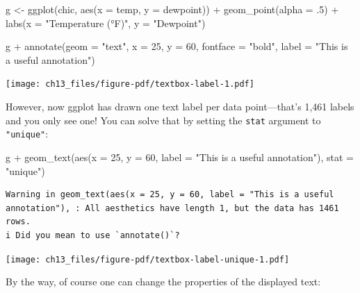 \documentclass[
  letterpaper,
  DIV=11,
  numbers=noendperiod]{scrreprt}
\newenvironment{Shaded}{\begin{snugshade}}{\end{snugshade}}
\newcommand{\AttributeTok}[1]{\textcolor[rgb]{0.40,0.45,0.13}{#1}}
\newcommand{\DecValTok}[1]{\textcolor[rgb]{0.68,0.00,0.00}{#1}}
\newcommand{\FunctionTok}[1]{\textcolor[rgb]{0.28,0.35,0.67}{#1}}
\newcommand{\NormalTok}[1]{\textcolor[rgb]{0.00,0.23,0.31}{#1}}
\newcommand{\OtherTok}[1]{\textcolor[rgb]{0.00,0.23,0.31}{#1}}
\newcommand{\SpecialCharTok}[1]{\textcolor[rgb]{0.37,0.37,0.37}{#1}}
\newcommand{\StringTok}[1]{\textcolor[rgb]{0.13,0.47,0.30}{#1}}
\begin{document}
\begin{Shaded}
\begin{Highlighting}[]
\NormalTok{g }\OtherTok{\textless{}{-}}
  \FunctionTok{ggplot}\NormalTok{(chic, }\FunctionTok{aes}\NormalTok{(}\AttributeTok{x =}\NormalTok{ temp, }\AttributeTok{y =}\NormalTok{ dewpoint)) }\SpecialCharTok{+}
  \FunctionTok{geom\_point}\NormalTok{(}\AttributeTok{alpha =}\NormalTok{ .}\DecValTok{5}\NormalTok{) }\SpecialCharTok{+}
  \FunctionTok{labs}\NormalTok{(}\AttributeTok{x =} \StringTok{"Temperature (°F)"}\NormalTok{, }\AttributeTok{y =} \StringTok{"Dewpoint"}\NormalTok{)}

\NormalTok{g }\SpecialCharTok{+} 
  \FunctionTok{annotate}\NormalTok{(}\AttributeTok{geom =} \StringTok{"text"}\NormalTok{, }\AttributeTok{x =} \DecValTok{25}\NormalTok{, }\AttributeTok{y =} \DecValTok{60}\NormalTok{, }\AttributeTok{fontface =} \StringTok{"bold"}\NormalTok{, }
                \AttributeTok{label =} \StringTok{"This is a useful annotation"}\NormalTok{)}
\end{Highlighting}
\end{Shaded}

\texttt{[image: ch13\_files/figure-pdf/textbox-label-1.pdf]}

However, now ggplot has drawn one text label per data point---that's
1,461 labels and you only see one! You can solve that by setting the
\texttt{stat} argument to \texttt{"unique"}:

\begin{Shaded}
\begin{Highlighting}[]
\NormalTok{g }\SpecialCharTok{+}
  \FunctionTok{geom\_text}\NormalTok{(}\FunctionTok{aes}\NormalTok{(}\AttributeTok{x =} \DecValTok{25}\NormalTok{, }\AttributeTok{y =} \DecValTok{60}\NormalTok{,}
                \AttributeTok{label =} \StringTok{"This is a useful annotation"}\NormalTok{),}
            \AttributeTok{stat =} \StringTok{"unique"}\NormalTok{)}
\end{Highlighting}
\end{Shaded}

\begin{verbatim}
Warning in geom_text(aes(x = 25, y = 60, label = "This is a useful annotation"), : All aesthetics have length 1, but the data has 1461 rows.
i Did you mean to use `annotate()`?
\end{verbatim}

\texttt{[image: ch13\_files/figure-pdf/textbox-label-unique-1.pdf]}

By the way, of course one can change the properties of the displayed
text:
\end{document}
